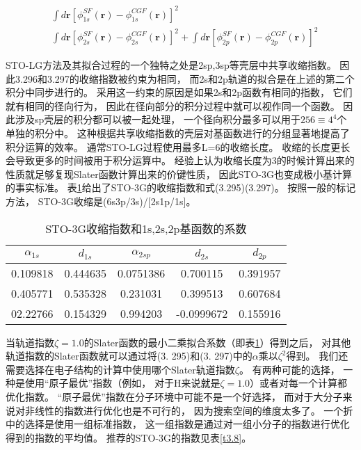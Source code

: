 \begin{align*}
	&\int d\mathbf{r}[\phi_{1s}^{SF}(\mathbf{r})-\phi_{1s}^{CGF}(\mathbf{r})]^2\\
	&\int d\mathbf{r}[\phi_{2s}^{SF}(\mathbf{r})-\phi_{2s}^{CGF}(\mathbf{r})]^2+	\int d\mathbf{r}[\phi_{2p}^{SF}(\mathbf{r})-\phi_{2p}^{CGF}(\mathbf{r})]^2	
\end{align*}

STO-LG方法及其拟合过程的一个独特之处是2sp,3sp等壳层中共享收缩指数。
因此3.296和3.297的收缩指数被约束为相同，
而2s和2p轨道的拟合是在上述的第二个积分中同步进行的。
采用这一约束的原因是如果2s和2p函数有相同的指数，
它们就有相同的径向行为，
因此在径向部分的积分过程中就可以视作同一个函数。
因此涉及sp壳层的积分都可以被一起处理，
一个径向积分最多可以用于$256\equiv4^4$个单独的积分中。
这种根据共享收缩指数的壳层对基函数进行的分组显著地提高了积分运算的效率。
通常STO-LG过程使用最多L=6的收缩长度。
收缩的长度更长会导致更多的时间被用于积分运算中。
经验上认为收缩长度为3的时候计算出来的性质就足够复现Slater函数计算出来的价键性质，
因此STO-3G也变成极小基计算的事实标准。
表\ref{t3.7}给出了STO-3G的收缩指数和式(3.295)(3.297)。
按照一般的标记方法，
STO-3G收缩是(6s3p/3s)/[2s1p/1s]。
\begin{table}[h]
	\centering\caption{STO-3G收缩指数和1s,2s,2p基函数的系数}
	\begin{tabular}{ccccc}
		\hline
		$\alpha_{1s}$&$d_{1s}$&$\alpha_{2sp}$&$d_{2s}$&$d_{2p}$\\\hline
		0.109818	 &0.444635&0.0751386	 &0.700115&0.391957\\
		0.405771	 &0.535328&0.231031	 &0.399513&0.607684\\
		02.22766	 &0.154329&0.994203	 &-0.0999672&0.155916\\
		\hline
	\end{tabular}
	\label{t3.7}
\end{table}
当轨道指数$\zeta = 1.0$的Slater函数的最小二乘拟合系数（即表\ref{t3.7}）得到之后，
对其他轨道指数的Slater函数就可以通过将(3.
295)和(3.
297)中的$\alpha$乘以$\zeta^2$得到。
我们还需要选择在电子结构的计算中使用哪个Slater轨道指数$\zeta$。
有两种可能的选择，
一种是使用“原子最优”指数（例如，
对于H来说就是$\zeta=1.0$）或者对每一个计算都优化指数。
“原子最优”指数在分子环境中可能不是一个好选择，
而对于大分子来说对非线性的指数进行优化也是不可行的，
因为搜索空间的维度太多了。
一个折中的选择是使用一组标准指数，
这一组指数是通过对一组小分子的指数进行优化得到的指数的平均值。
推荐的STO-3G的指数见表\ref{t3.8}。

